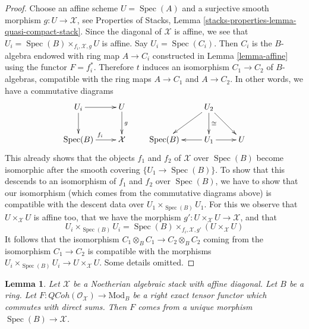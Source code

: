 \documentclass{stacks-project}
\theoremstyle{plain}
\newtheorem{lemma}[subsection]{Lemma}
\theoremstyle{definition}
\theoremstyle{remark}
\numberwithin{equation}{subsection}
\def\Spec{\mathop{\mathrm{Spec}}}
\def\QCoh{\mathit{QCoh}}
\begin{document}
\begin{proof}
Choose an affine scheme $U = \Spec(A)$ and a surjective smooth
morphism $g : U \to \mathcal{X}$, see
Properties of Stacks, Lemma \ref{stacks-properties-lemma-quasi-compact-stack}.
Since the diagonal of $\mathcal{X}$ is affine, we see that
$U_i = \Spec(B) \times_{f_i, \mathcal{X}, g} U$ is affine.
Say $U_i = \Spec(C_i)$. Then $C_i$ is the $B$-algebra endowed
with ring map $A \to C_i$ constructed in Lemma \ref{lemma-affine}
using the functor $F = f_i^*$. Therefore $t$ induces an isomorphism
$C_1 \to C_2$ of $B$-algebras, compatible with the ring maps
$A \to C_1$ and $A \to C_2$. In other words, we have a commutative
diagrams
$$
\xymatrix{
U_i \ar[r] \ar[d] & U \ar[d]^g \\
\Spec(B) \ar[r]^{f_i} & \mathcal{X}
}
\quad\quad
\xymatrix{
&
U_2 \ar[ld] \ar[d]^{\cong} \ar[rd] \\
\Spec(B) &
U_1 \ar[l] \ar[r] &
U
}
$$
This already shows that the objects $f_1$ and $f_2$ of $\mathcal{X}$
over $\Spec(B)$ become isomorphic after the smooth covering
$\{U_1 \to \Spec(B)\}$. To show that this descends to an isomorphism
of $f_1$ and $f_2$ over $\Spec(B)$, we have to show that our isomorphism
(which comes from the commutative diagrams above) is compatible
with the descent data over $U_1 \times_{\Spec(B)} U_1$. For this
we observe that $U \times_\mathcal{X} U$ is affine too, that
we have the morphism $g' : U \times_\mathcal{X} U \to \mathcal{X}$, and
that
$$
U_i \times_{\Spec(B)} U_i =
\Spec(B) \times_{f_i, \mathcal{X}, g'}
(U \times_\mathcal{X} U)
$$
It follows that the isomorphism $C_1 \otimes_B C_1 \to C_2 \otimes_B C_2$
coming from the isomorphism $C_1 \to C_2$ is compatible with the
morphisms $U_i \times_{\Spec(B)} U_i \to U \times_\mathcal{X} U$.
Some details omitted.
\end{proof}

\begin{lemma}
\label{lemma-main}
Let $\mathcal{X}$ be a Noetherian algebraic stack with affine diagonal.
Let $B$ be a ring.
Let $F : \QCoh(\mathcal{O}_\mathcal{X}) \to \text{Mod}_B$
be a right exact tensor functor which commutes with direct sums.
Then $F$ comes from a unique morphism $\Spec(B) \to \mathcal{X}$.
\end{lemma}
\end{document}
